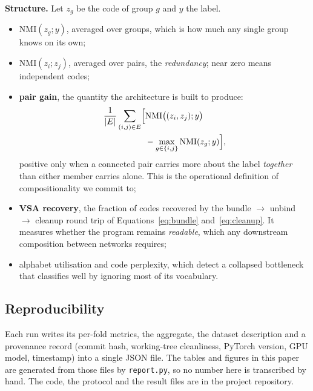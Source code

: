 \textbf{Structure.} Let $z_g$ be the code of group $g$ and $y$ the label.
\begin{itemize}[leftmargin=*, itemsep=1pt, topsep=2pt]
  \item $\mathrm{NMI}(z_g; y)$, averaged over groups, which is how much any
        single group knows on its own;
  \item $\mathrm{NMI}(z_i; z_j)$, averaged over pairs, the \emph{redundancy};
        near zero means independent codes;
  \item \textbf{pair gain}, the quantity the architecture is built to produce:
        \begin{equation}
          \begin{aligned}
            \frac{1}{|E|}\sum_{(i,j)\in E} \Bigl[
              &\mathrm{NMI}\bigl((z_i,z_j); y\bigr)\\
              &- \max_{g \in \{i,j\}} \mathrm{NMI}(z_g;y) \Bigr],
          \end{aligned}
          \label{eq:pairgain}
        \end{equation}
        positive only when a connected pair carries more about the label
        \emph{together} than either member carries alone. This is the
        operational definition of compositionality we commit to;
  \item \textbf{VSA recovery}, the fraction of codes recovered by the
        bundle $\rightarrow$ unbind $\rightarrow$ cleanup round trip of
        Equations~\ref{eq:bundle} and~\ref{eq:cleanup}. It measures whether the
        program remains \emph{readable}, which any downstream composition
        between networks requires;
  \item alphabet utilisation and code perplexity, which detect a collapsed
        bottleneck that classifies well by ignoring most of its vocabulary.
\end{itemize}

\subsection{Reproducibility}

Each run writes its per-fold metrics, the aggregate, the dataset description and
a provenance record (commit hash, working-tree cleanliness, PyTorch version, GPU
model, timestamp) into a single JSON file. The tables and figures in this paper
are generated from those files by \texttt{report.py}, so no number here is
transcribed by hand. The code, the protocol and the result files are in the
project repository.
